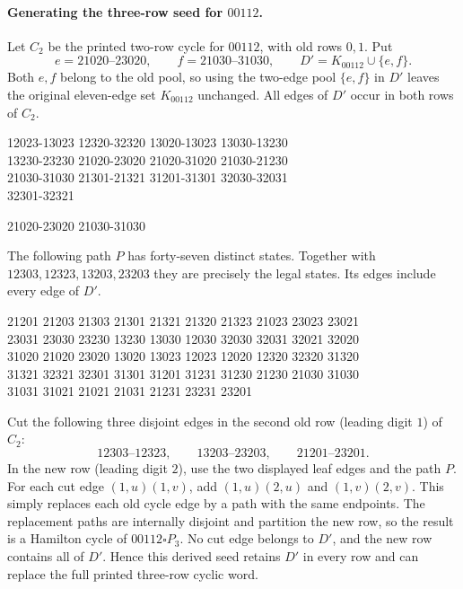 \paragraph{Generating the three-row seed for $00112$.}
Let $C_2$ be the printed two-row cycle for $00112$, with old rows
$0,1$. Put
\[
e=21020\text{--}23020,\qquad f=21030\text{--}31030,
\qquad D'=K_{00112}\cup\{e,f\}.
\]
Both $e,f$ belong to the old pool, so using the two-edge pool
$\{e,f\}$ in $D'$ leaves the original eleven-edge set $K_{00112}$
unchanged. All edges of $D'$ occur in both rows of $C_2$.

\begingroup\small\ttfamily\begin{flushleft}
12023-13023 12320-32320 13020-13023 13030-13230\\
13230-23230 21020-23020 21020-31020 21030-21230\\
21030-31030 21301-21321 31201-31301 32030-32031\\
32301-32321\\
\end{flushleft}\endgroup
\begingroup\small\ttfamily\begin{flushleft}
21020-23020 21030-31030\\
\end{flushleft}\endgroup

The following path $P$ has forty-seven distinct states. Together
with $12303,12323,13203,23203$ they are precisely the legal states.
Its edges include every edge of $D'$.
\begingroup\small\ttfamily\begin{flushleft}
21201 21203 21303 21301 21321 21320 21323 21023 23023 23021\\
23031 23030 23230 13230 13030 12030 32030 32031 32021 32020\\
31020 21020 23020 13020 13023 12023 12020 12320 32320 31320\\
31321 32321 32301 31301 31201 31231 31230 21230 21030 31030\\
31031 31021 21021 21031 21231 23231 23201
\end{flushleft}\endgroup

Cut the following three disjoint edges in the second old row
(leading digit $1$) of $C_2$:
\[
12303\text{--}12323,\qquad
13203\text{--}23203,\qquad
21201\text{--}23201.
\]
In the new row (leading digit $2$), use the two displayed leaf edges
and the path $P$.
For each cut edge $(1,u)(1,v)$, add $(1,u)(2,u)$ and $(1,v)(2,v)$.
This simply replaces each old cycle edge by a path with the same
endpoints. The replacement paths are internally disjoint and
partition the new row, so the result is a Hamilton cycle of
$00112\square P_3$. No cut edge belongs to $D'$, and the new row
contains all of $D'$. Hence this derived seed retains $D'$ in every
row and can replace the full printed three-row cyclic word.


